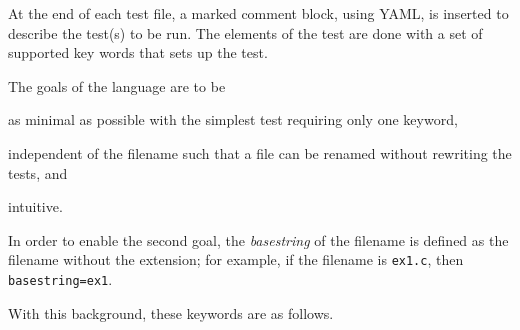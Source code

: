 At the end of each test file, a marked comment block, using YAML, is
inserted to describe the test(s) to be run.  The elements of the
test are done with a set of supported key words that sets up the test.
%
\begin{description}
\item The goals of the language are to be \leavevmode \setcounter{listcnt0}{0}
\begin{list}{.}
{
\setlength{\rightmargin}{\leftmargin}
}

\item as minimal as possible with the simplest test requiring only one
keyword,

\item independent of the filename such that a file can be renamed
without rewriting the tests, and

\item intuitive.
\end{list}

\end{description}

In order to enable the second goal, the \emph{basestring} of the filename is defined
as the filename without the extension; for example, if the filename is \lstinline{ex1.c},
then \lstinline{basestring=ex1}.

\noindent
With this background, these keywords are as follows.

